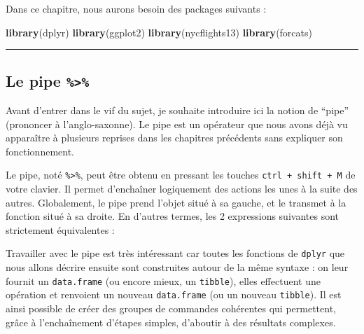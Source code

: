 \documentclass[a4paperpaper,]{article}
\newenvironment{Shaded}{\begin{snugshade}}{\end{snugshade}}
\newcommand{\KeywordTok}[1]{\textcolor[rgb]{0.13,0.29,0.53}{\textbf{#1}}}
\newcommand{\StringTok}[1]{\textcolor[rgb]{0.31,0.60,0.02}{#1}}
\newcommand{\CommentTok}[1]{\textcolor[rgb]{0.56,0.35,0.01}{\textit{#1}}}
\newcommand{\OperatorTok}[1]{\textcolor[rgb]{0.81,0.36,0.00}{\textbf{#1}}}
\newcommand{\NormalTok}[1]{#1}
\theoremstyle{definition}
\theoremstyle{definition}
\theoremstyle{definition}
\theoremstyle{remark}
\begin{document}
Dans ce chapitre, nous aurons besoin des packages suivants :

\begin{Shaded}
\begin{Highlighting}[]
\KeywordTok{library}\NormalTok{(dplyr)}
\KeywordTok{library}\NormalTok{(ggplot2)}
\KeywordTok{library}\NormalTok{(nycflights13)}
\KeywordTok{library}\NormalTok{(forcats)}
\end{Highlighting}
\end{Shaded}

\begin{center}\rule{0.5\linewidth}{\linethickness}\end{center}

\subsection{\texorpdfstring{Le pipe
\texttt{\%\textgreater{}\%}}{Le pipe \%\textgreater{}\%}}\label{le-pipe}

Avant d'entrer dans le vif du sujet, je souhaite introduire ici la
notion de ``pipe'' (prononcer à l'anglo-saxonne). Le pipe est un
opérateur que nous avons déjà vu apparaître à plusieurs reprises dans
les chapitres précédents sans expliquer son fonctionnement.

Le pipe, noté \texttt{\%\textgreater{}\%}, peut être obtenu en pressant
les touches \texttt{ctrl\ +\ shift\ +\ M} de votre clavier. Il permet
d'enchaîner logiquement des actions les unes à la suite des autres.
Globalement, le pipe prend l'objet situé à sa gauche, et le transmet à
la fonction situé à sa droite. En d'autres termes, les 2 expressions
suivantes sont strictement équivalentes :

\begin{Shaded}
\end{Shaded}

Travailler avec le pipe est très intéressant car toutes les fonctions de
\texttt{dplyr} que nous allons décrire ensuite sont construites autour
de la même syntaxe : on leur fournit un \texttt{data.frame} (ou encore
mieux, un \texttt{tibble}), elles effectuent une opération et renvoient
un nouveau \texttt{data.frame} (ou un nouveau \texttt{tibble}). Il est
ainsi possible de créer des groupes de commandes cohérentes qui
permettent, grâce à l'enchaînement d'étapes simples, d'aboutir à des
résultats complexes.
\end{document}
